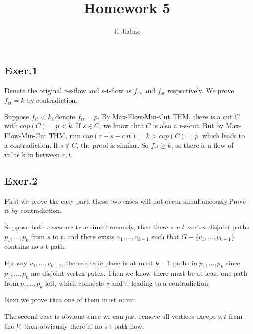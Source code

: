 \documentclass[UTF8]{ctexart}
\begin{document}
 

\title{Homework 5}
\author{Ji Jiabao}
\maketitle

\subsection*{Exer.1}
    Denote the original r-s-flow and s-t-flow as $f_{rs}$ and $f_{st}$ respectively.
    We prove $f_{rt} = k$ by contradiction.

    Suppose $f_{rt} < k$, denote $f_{rt} = p$. By Max-Flow-Min-Cut THM, there is a cut $C$ 
    with $cap(C) = p < k$. If $s \in C$, we know that $C$ is also a r-s-cut. But by Max-Flow-Min-Cut
    THM, min $cap(r-s-cut) = k > cap(C) = p$, which leads to a contradiction. If $s \notin C$, the proof
    is similar. So $f_{rt} \ge k$, so there is a flow of value k in between $r, t$.


\subsection*{Exer.2}
    First we prove the easy part, these two cases will not occur simultaneously.Prove it by contradiction.

    Suppose both cases are true simultaneously, then there are $k$ vertex disjoint paths $p_1, ..., p_k$ from $s$ to $t$.
    and there exists $v_1, ..., v_{k - 1}$ such that $G - \{ v_1, ...,v_{k - 1}\}$ contains no 
    s-t-path. 
    
    For any $v_1, ..., v_{k - 1}$, the can take place in at most $k - 1$ paths in $p_1,...,p_k$ since $p_1, ..., p_k$ are
    disjoint vertex paths. Then we know there must be at least one path from $p_1,..,p_k$ left, which connects $s$ and $t$,
    leading to a contradiction.


    Next we prove that one of them must occur.

    The second case is obvious since we can just remove all vertices except $s, t$ from the $V$, then obviously there're no
    s-t-path now.
\end{document}
